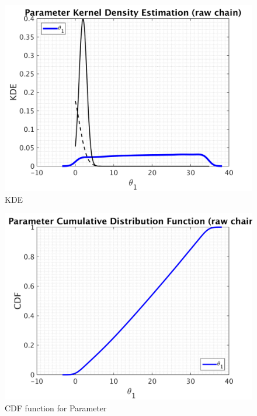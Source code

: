 \begin{figure}[h!]
  
  \centering
   \includegraphics[scale=0.75]{output_300000/simple_ip_kde_raw}
   \caption{ KDE }
\end{figure}

\begin{figure}[h!]
  
  \centering
   \includegraphics[scale=0.75]{output_300000/simple_ip_cdf_raw}
   \caption{CDF function for Parameter }
\end{figure}



